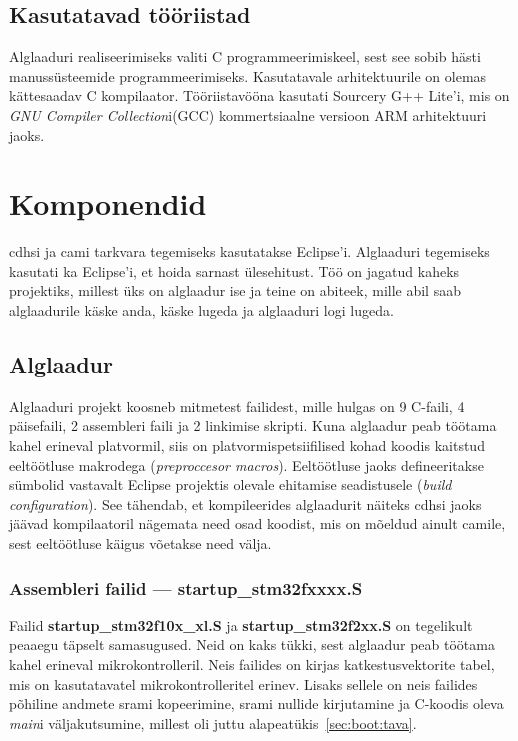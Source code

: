 \documentclass[12pt,a4paper]{article}
\begin{document}
\subsection{Kasutatavad tööriistad}
Alglaaduri realiseerimiseks valiti C programmeerimiskeel, sest see sobib hästi
manussüsteemide programmeerimiseks. Kasutatavale arhitektuurile on olemas
kättesaadav C kompilaator. Tööriistavööna kasutati Sourcery G++ Lite'i, mis on
\textit{GNU Compiler Collection}i(GCC) kommertsiaalne versioon ARM arhitektuuri
jaoks.

\section{Komponendid}
\Gls{cdhs}i ja \gls{cam}i tarkvara tegemiseks kasutatakse Eclipse'i. Alglaaduri
tegemiseks kasutati ka Eclipse'i, et hoida sarnast ülesehitust. Töö on jagatud
kaheks projektiks, millest üks on alglaadur ise ja teine on abiteek, mille abil
saab alglaadurile käske anda, käske lugeda ja alglaaduri logi lugeda.

\subsection{Alglaadur}
Alglaaduri projekt koosneb mitmetest failidest, mille hulgas on 9 C-faili, 4
päisefaili, 2 assembleri faili ja 2 linkimise skripti. Kuna alglaadur peab
töötama kahel erineval platvormil, siis on platvormispetsiifilised kohad koodis
kaitstud eeltöötluse makrodega (\textit{preproccesor macros}). Eeltöötluse jaoks
defineeritakse sümbolid vastavalt Eclipse projektis olevale ehitamise
seadistusele (\textit{build configuration}). See tähendab, et kompileerides
alglaadurit näiteks \gls{cdhs}i jaoks jäävad kompilaatoril nägemata need osad
koodist, mis on mõeldud ainult \gls{cam}ile, sest eeltöötluse käigus võetakse
need välja.

\subsubsection{Assembleri failid --- \textbf{startup\_stm32fxxxx.S}}
Failid \textbf{startup\_stm32f10x\_xl.S} ja \textbf{startup\_stm32f2xx.S} on
tegelikult peaaegu täpselt samasugused. Neid on kaks tükki, sest alglaadur peab
töötama kahel erineval mikrokontrolleril. Neis failides on kirjas
katkestusvektorite tabel, mis on kasutatavatel mikrokontrolleritel erinev.
Lisaks sellele on neis failides põhiline andmete \gls{sram}i kopeerimine,
\gls{sram}i nullide kirjutamine ja C-koodis oleva \textit{main}i väljakutsumine,
millest oli juttu alapeatükis~\ref{sec:boot:tava}.
\end{document}
